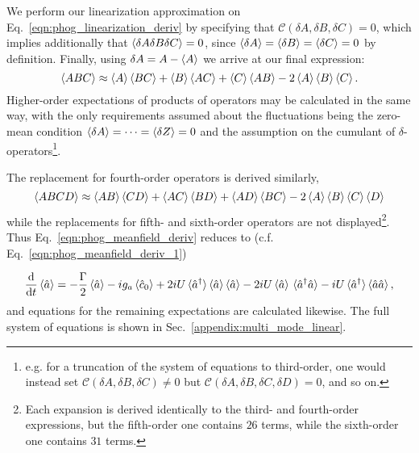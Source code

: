 \noindent We perform our linearization approximation on Eq.~\ref{eqn:phog_linearization_deriv} by specifying that $\mathcal{C}\left(\delta A, \delta B, \delta C \right) = 0$, which implies additionally that $\ev{\delta A \delta B \delta C} = 0$, since $\ev{\delta A} = \ev{\delta B} = \ev{\delta C} = 0$ by definition. Finally, using $\delta A = A - \ev{A}$ we arrive at our final expression:
\begin{equation}\label{eqn:linearization_3}
\ev{A B C} \approx \ev{A} \ev{B C} + \ev{B} \ev{A C} + \ev{C} \ev{A B} - 2 \ev{A} \ev{B} \ev{C}.
\end{equation}
Higher-order expectations of products of operators may be calculated in the same way, with the only requirements assumed about the fluctuations being the zero-mean condition $\ev{\delta A} = \dots = \ev{\delta Z} = 0$ and the assumption on the cumulant of $\delta$-operators\footnote{e.g. for a truncation of the system of equations to third-order, one would instead set $\mathcal{C}\left(\delta A, \delta B, \delta C\right) \ne 0$ but $\mathcal{C}\left(\delta A, \delta B, \delta C , \delta D\right) = 0$, and so on.}.

The replacement for fourth-order operators is derived similarly,
\begin{equation}
\ev{A B C D} \approx \ev{A B}\ev{C D} + \ev{A C}\ev{B D} + \ev{A D}\ev{B C} - 2 \ev{A}\ev{B}\ev{C}\ev{D}
\end{equation}
while the replacements for fifth- and sixth-order operators are not displayed\footnote{Each expansion is derived identically to the third- and fourth-order expressions, but the fifth-order one contains $26$ terms, while the sixth-order one contains $31$ terms.}. Thus Eq.~\ref{eqn:phog_meanfield_deriv} reduces to (c.f. Eq.~\ref{eqn:phog_meanfield_deriv_1})

\begin{equation}
\ddt \ev{\hat{a}} = - \frac{\Gamma}{2} \ev{\hat{a}} - i g_a \ev{\hat{c}_0} + 2 i U \ev*{\hat{a}^\dagger}\ev{\hat{a}}\ev{\hat{a}} - 2 i U \ev{\hat{a}}\ev*{\hat{a}^\dagger \hat{a}} - i U \ev*{\hat{a}^\dagger} \ev{\hat{a} \hat{a}},
\end{equation}
and equations for the remaining expectations are calculated likewise. The full system of equations is shown in Sec.~\ref{appendix:multi_mode_linear}.





